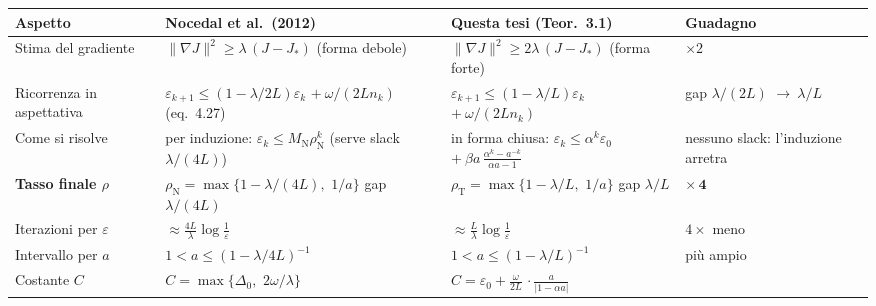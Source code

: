 \documentclass[11pt,a4paper]{article}
\begin{document}
\begin{tabular}{@{}p{}p{}p{}p{}@{}}
\toprule
\textbf{Aspetto} & \textbf{Nocedal et al.\ (2012)} & \textbf{Questa tesi (Teor.\ 3.1)} & \textbf{Guadagno} \\
\midrule
Stima del gradiente
  & $\|\nabla J\|^2\ge\lambda\,(J-J_*)$ \newline (forma debole)
  & $\|\nabla J\|^2\ge 2\lambda\,(J-J_*)$ \newline (forma forte)
  & $\times 2$ \\[2pt]
Ricorrenza in aspettativa
  & $\varepsilon_{k+1}\le(1-\lambda/2L)\varepsilon_k$ \newline $+\ \omega/(2L n_k)$ \newline (eq.~4.27)
  & $\varepsilon_{k+1}\le(1-\lambda/L)\varepsilon_k$ \newline $+\ \omega/(2L n_k)$
  & gap $\lambda/(2L)$ \newline $\to\ \lambda/L$ \\[2pt]
Come si risolve
  & per induzione: \newline $\varepsilon_k\le M_{\mathrm N}\rho_{\mathrm N}^k$ \newline (serve slack $\lambda/(4L)$)
  & in forma chiusa: \newline $\varepsilon_k\le\alpha^k\varepsilon_0$ \newline $+\ \beta a\,\frac{\alpha^k-a^{-k}}{\alpha a-1}$
  & nessuno slack: \newline l'induzione \newline arretra \\[2pt]
\textbf{Tasso finale $\rho$}
  & $\rho_{\mathrm N}=\max\{1-\lambda/(4L),$ \newline $1/a\}$ \newline gap $\lambda/(4L)$
  & $\rho_{\mathrm T}=\max\{1-\lambda/L,$ \newline $1/a\}$ \newline gap $\lambda/L$
  & $\mathbf{\times\,4}$ \\[2pt]
Iterazioni per $\varepsilon$
  & $\approx\frac{4L}{\lambda}\log\frac1\varepsilon$
  & $\approx\frac{L}{\lambda}\log\frac1\varepsilon$
  & $4\times$ meno \\[2pt]
Intervallo per $a$
  & $1<a\le(1-\lambda/4L)^{-1}$
  & $1<a\le(1-\lambda/L)^{-1}$
  & più ampio \\[2pt]
Costante $C$
  & $C=\max\{\Delta_0,$ \newline $2\omega/\lambda\}$
  & $C=\varepsilon_0+\frac{\omega}{2L}$ \newline $\cdot\,\frac{a}{|1-\alpha a|}$

\end{tabular}
\end{document}
